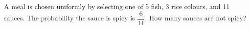 A meal is chosen uniformly by selecting one of 5 fish, 3 rice colours, and 11 sauces. The probability the sauce is spicy is $\dfrac{6}{11}$. How many sauces are not spicy?
